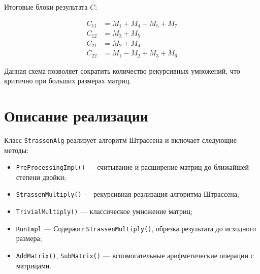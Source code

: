 \documentclass[14pt,a4paper]{extarticle}
\begin{document}
Итоговые блоки результата $C$:

\[
\begin{aligned}
C_{11} &= M_1 + M_4 - M_5 + M_7 \\
C_{12} &= M_3 + M_5 \\
C_{21} &= M_2 + M_4 \\
C_{22} &= M_1 - M_2 + M_3 + M_6
\end{aligned}
\]

Данная схема позволяет сократить количество рекурсивных умножений, что критично при больших размерах матриц.

\section{Описание реализации}

Класс \texttt{StrassenAlg} реализует алгоритм Штрассена и включает следующие методы:

\begin{itemize}
    \item \texttt{PreProcessingImpl()} — считывание и расширение матриц до ближайшей степени двойки;
    \item \texttt{StrassenMultiply()} — рекурсивная реализация алгоритма Штрассена;
    \item \texttt{TrivialMultiply()} — классическое умножение матриц;
    \item \texttt{RunImpl} — Содержит \texttt{StrassenMultiply()}, обрезка результата до исходного размера;
    \item \texttt{AddMatrix()}, \texttt{SubMatrix()} — вспомогательные арифметические операции с матрицами.
\end{itemize}
\end{document}
